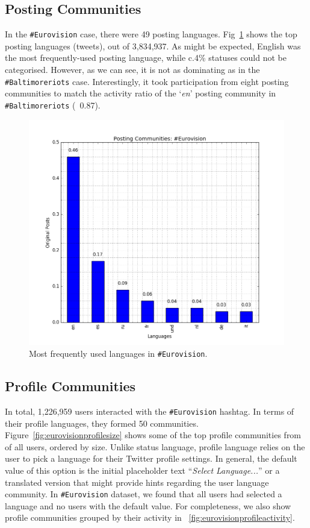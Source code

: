 \documentclass{llncs}
\begin{document}
\subsection{Posting Communities}\label{eurovisionpostingcomm}

In the {\texttt{\#Eurovision}} case, there were 49 posting
languages. Fig~\ref{fig:eurovisionlangfreq} shows the top posting
languages (tweets), out of 3,834,937. As might be expected, English
was the most frequently-used posting language, while c.4\% statuses
could not be categorised. However, as we can see, it is not as
dominating as in the {\texttt{\#Baltimoreriots}} case. Interestingly,
it took participation from eight posting communities to match the
activity ratio of the `{\emph{en}}' posting community in
{\texttt{\#Baltimoreriots}} (~0.87).

\begin{figure}[htb]
\centering
\includegraphics[width=\columnwidth]{images/eurovision_langfreq.png}
\caption{Most frequently used languages in {\texttt{\#Eurovision}}.}
\label{fig:eurovisionlangfreq}
\end{figure}

\subsection{Profile Communities}\label{ppcomm}

In total, 1,226,959 users interacted with the {\texttt{\#Eurovision}}
hashtag. In terms of their profile languages, they formed 50
communities. Figure~\ref{fig:eurovisionprofilesize} shows some of the
top profile communities from of all users, ordered by size. Unlike
status language, profile language relies on the user to pick a
language for their Twitter profile settings. In general, the default
value of this option is the initial placeholder text ``{\emph{Select
Language...}}'' or a translated version that might provide hints
regarding the user language community. In {\texttt{\#Eurovision}}
dataset, we found that all users had selected a language and no users
with the default value.  For completeness, we also show profile
communities grouped by their activity in
~\ref{fig:eurovisionprofileactivity}.
\end{document}
